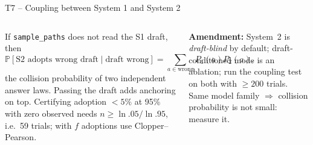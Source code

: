 \documentclass[aspectratio=169,10pt]{beamer}
\renewcommand{\Pr}{\mathbb{P}}
\begin{document}
\begin{frame}{T7 -- Coupling between System 1 and System 2}
\begin{columns}[T]
\begin{theorem}[T7]\small
If \texttt{sample\_paths} does not read the S1 draft, then
$$\Pr[\text{S2 adopts wrong draft}\mid\text{draft wrong}]=\sum_{a\in\text{wrong}}P_1(a)P_2(a),$$
the collision probability of two independent answer laws. Passing the draft adds anchoring on top. Certifying adoption $<5\%$ at 95\% with zero observed needs $n\ge\ln .05/\ln .95$, i.e.\ 59 trials; with $f$ adoptions use Clopper--Pearson.
\end{theorem}
\small\textbf{Amendment:} System~2 is \emph{draft-blind} by default; draft-conditioned mode is an ablation; run the coupling test on both with $\ge200$ trials. Same model family $\Rightarrow$ collision probability is not small: measure it.
\centering
{}
\end{columns}
\end{frame}
\end{document}
